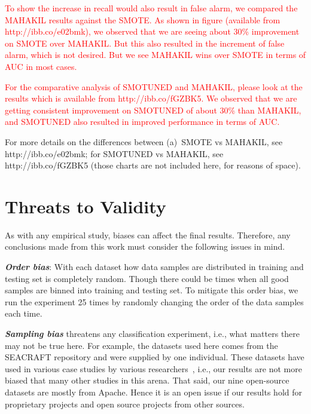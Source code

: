 \documentclass[sigconf,review, anonymous]{acmart}
\theoremstyle{break}
\theoremstyle{break}
\newcommand{\sma}{{\sc SMOTE}}
\newcommand{\smb}{{\sc SMOTUNED}}
\begin{document}
\textcolor{red}{To show the increase in recall would also result in false alarm, we compared the MAHAKIL results against the {\sma}. As shown in figure (available from http://ibb.co/e02bmk), we observed that we are seeing about 30\% improvement on {\sma} over MAHAKIL. But this also resulted in the increment of false alarm, which is not desired. But we see MAHAKIL wins over {\sma} in terms of AUC in most cases.}

\textcolor{red}{For the comparative analysis of {\smb} and MAHAKIL, please look at the results which is available from http://ibb.co/fGZBK5. We observed that we are getting consistent improvement on {\smb} of about 30\% than MAHAKIL, and {\smb} also resulted in improved performance in terms of AUC.}

For more details on the differences between (a)~{\sma} vs MAHAKIL, see http://ibb.co/e02bmk; for {\smb} vs MAHAKIL, see http://ibb.co/fGZBK5 (those charts are not included here, for reasons of space).

\section{Threats to Validity}
\label{sect:validity}

As with any empirical study, biases can affect the final
results. Therefore, any conclusions made from this work must consider the following issues in mind.

\textbf{\textit{Order bias}}: With each dataset how data samples are distributed in training and testing set is completely random. Though there could be times when all good samples are binned into training and testing set. To mitigate this order bias, we run
the experiment 25 times by randomly changing the order of the data samples each time.

\textbf{\textit{Sampling bias}} threatens any classification experiment, i.e., what matters there may not be true here. For example, the datasets used here comes from the SEACRAFT repository and were supplied by one individual. These datasets have used in various case studies by various researchers~\cite{he2012investigation,peters2013better,peters2013balancing,turhan2013empirical}, i.e., our results are not more biased that many other studies in this arena.
That said, our nine open-source datasets   are mostly from Apache. Hence
it is an open issue if our results hold for
 proprietary projects and open source projects from other sources.

\end{document}
